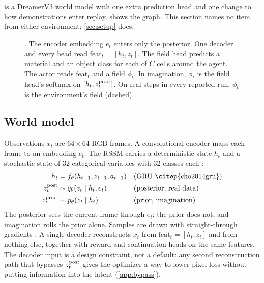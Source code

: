 \section{\method{}}
\label{sec:method}

\method{} is a DreamerV3 world model \citep{hafner2023dreamerv3} with one extra prediction head and one change to how demonstrations enter replay.
 shows the graph.
This section names no item from either environment; \cref{sec:setup} does.

\begin{figure}[t]
  \centering
  
  \caption{\method{}. The encoder embedding $e_t$ enters only the posterior. One decoder and every head read $\mathrm{feat}_t=[h_t, z_t]$. The field head predicts a material and an object class for each of $C$ cells around the agent. The actor reads $\mathrm{feat}_t$ and a field $\phi_t$. In imagination, $\phi_t$ is the field head's softmax on $[h_t,z^{\mathrm{prior}}_t]$. On real steps in every reported run, $\phi_t$ is the environment's field (dashed).}
  \label{fig:architecture}
\end{figure}

\subsection{World model}
\label{sec:method-wm}

Observations $x_t$ are $64\times64$ RGB frames.
A convolutional encoder maps each frame to an embedding $e_t$.
The RSSM \citep{hafner2019planet} carries a deterministic state $h_t$ and a stochastic state of 32 categorical variables with 32 classes each \citep{hafner2021dreamerv2}:
\begin{align}
  h_t &= f_\theta(h_{t-1}, z_{t-1}, a_{t-1}) && \text{(GRU \citep{cho2014gru})} \\
  \zpost_t &\sim q_\theta(z_t \mid h_t, e_t) && \text{(posterior, real data)} \\
  \zprior_t &\sim p_\theta(z_t \mid h_t) && \text{(prior, imagination)}
\end{align}
The posterior sees the current frame through $e_t$; the prior does not, and imagination rolls the prior alone.
Samples are drawn with straight-through gradients \citep{bengio2013estimating}.
A single decoder reconstructs $x_t$ from $\mathrm{feat}_t = [h_t, z_t]$ and from nothing else, together with reward and continuation heads on the same features.
The decoder input is a design constraint, not a default: any second reconstruction path that bypasses $z^{\mathrm{post}}_t$ gives the optimizer a way to lower pixel loss without putting information into the latent (\cref{app:bypass}).

